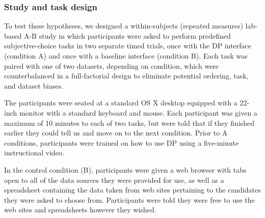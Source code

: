 \documentclass{sigchi}
\begin{document}
\subsubsection{Study and task design}
To test these hypotheses, we designed a within-subjects (repeated measures) lab-based A-B study in which participants were asked to perform predefined subjective-choice tasks in two separate timed trials, once with the DP interface (condition A) and once with a baseline interface (condition B).  Each task was paired with one of two datasets, depending on condition, which were counterbalanced in a full-factorial design to eliminate potential ordering, task, and dataset biases.

The participants were seated at a standard OS X desktop equipped with a 22-inch monitor with a standard keyboard and mouse. Each participant was given a maximum of 10 minutes to each of two tasks, but were told that if they finished earlier they could tell us and move on to the next condition.  Prior to A conditions, participants were trained on how to use DP using a five-minute instructional video.

In the control condition (B), participants were given a web browser with tabs open to all of the data sources they were provided for use, as well as a spreadsheet containing the data taken from web sites pertaining to the candidates they were asked to choose from. Participants were told they were free to use the web sites and spreadsheets however they wished. 
\end{document}

